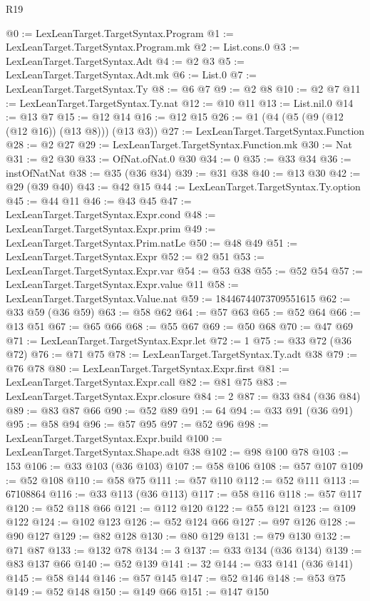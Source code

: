 \begin{lexlean}{R19}
\begin{coremodule}
@0 := LexLeanTarget.TargetSyntax.Program
@1 := LexLeanTarget.TargetSyntax.Program.mk
@2 := List.cons.{0}
@3 := LexLeanTarget.TargetSyntax.Adt
@4 := @2 @3
@5 := LexLeanTarget.TargetSyntax.Adt.mk
@6 := List.{0}
@7 := LexLeanTarget.TargetSyntax.Ty
@8 := @6 @7
@9 := @2 @8
@10 := @2 @7
@11 := LexLeanTarget.TargetSyntax.Ty.nat
@12 := @10 @11
@13 := List.nil.{0}
@14 := @13 @7
@15 := @12 @14
@16 := @12 @15
@26 := @1 (@4 (@5 (@9 (@12 (@12 @16)) (@13 @8))) (@13 @3))
@27 := LexLeanTarget.TargetSyntax.Function
@28 := @2 @27
@29 := LexLeanTarget.TargetSyntax.Function.mk
@30 := Nat
@31 := @2 @30
@33 := OfNat.ofNat.{0} @30
@34 := 0
@35 := @33 @34
@36 := instOfNatNat
@38 := @35 (@36 @34)
@39 := @31 @38
@40 := @13 @30
@42 := @29 (@39 @40)
@43 := @42 @15
@44 := LexLeanTarget.TargetSyntax.Ty.option
@45 := @44 @11
@46 := @43 @45
@47 := LexLeanTarget.TargetSyntax.Expr.cond
@48 := LexLeanTarget.TargetSyntax.Expr.prim
@49 := LexLeanTarget.TargetSyntax.Prim.natLe
@50 := @48 @49
@51 := LexLeanTarget.TargetSyntax.Expr
@52 := @2 @51
@53 := LexLeanTarget.TargetSyntax.Expr.var
@54 := @53 @38
@55 := @52 @54
@57 := LexLeanTarget.TargetSyntax.Expr.value @11
@58 := LexLeanTarget.TargetSyntax.Value.nat
@59 := 18446744073709551615
@62 := @33 @59 (@36 @59)
@63 := @58 @62
@64 := @57 @63
@65 := @52 @64
@66 := @13 @51
@67 := @65 @66
@68 := @55 @67
@69 := @50 @68
@70 := @47 @69
@71 := LexLeanTarget.TargetSyntax.Expr.let
@72 := 1
@75 := @33 @72 (@36 @72)
@76 := @71 @75
@78 := LexLeanTarget.TargetSyntax.Ty.adt @38
@79 := @76 @78
@80 := LexLeanTarget.TargetSyntax.Expr.first
@81 := LexLeanTarget.TargetSyntax.Expr.call
@82 := @81 @75
@83 := LexLeanTarget.TargetSyntax.Expr.closure
@84 := 2
@87 := @33 @84 (@36 @84)
@89 := @83 @87 @66
@90 := @52 @89
@91 := 64
@94 := @33 @91 (@36 @91)
@95 := @58 @94
@96 := @57 @95
@97 := @52 @96
@98 := LexLeanTarget.TargetSyntax.Expr.build
@100 := LexLeanTarget.TargetSyntax.Shape.adt @38
@102 := @98 @100 @78
@103 := 153
@106 := @33 @103 (@36 @103)
@107 := @58 @106
@108 := @57 @107
@109 := @52 @108
@110 := @58 @75
@111 := @57 @110
@112 := @52 @111
@113 := 67108864
@116 := @33 @113 (@36 @113)
@117 := @58 @116
@118 := @57 @117
@120 := @52 @118 @66
@121 := @112 @120
@122 := @55 @121
@123 := @109 @122
@124 := @102 @123
@126 := @52 @124 @66
@127 := @97 @126
@128 := @90 @127
@129 := @82 @128
@130 := @80 @129
@131 := @79 @130
@132 := @71 @87
@133 := @132 @78
@134 := 3
@137 := @33 @134 (@36 @134)
@139 := @83 @137 @66
@140 := @52 @139
@141 := 32
@144 := @33 @141 (@36 @141)
@145 := @58 @144
@146 := @57 @145
@147 := @52 @146
@148 := @53 @75
@149 := @52 @148
@150 := @149 @66
@151 := @147 @150

\end{coremodule}
\end{lexlean}
